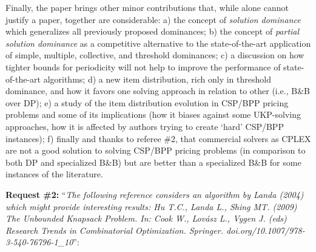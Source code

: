 \documentclass{elsarticle}
\begin{document}
Finally, the paper brings other minor contributions that, while alone cannot justify a paper, together are considerable:
a) the concept of \emph{solution dominance} which generalizes all previously proposed dominances; 
b) the concept of \emph{partial solution dominance} as a competitive alternative to the state-of-the-art application of simple, multiple, collective, and threshold dominances;
c) a discussion on how tighter bounds for periodicity will not help to improve the performance of state-of-the-art algorithms;
d) a new item distribution, rich only in threshold dominance, and how it favors one solving approach in relation to other (i.e., B\&B over DP);
e) a study of the item distribution evolution in CSP/BPP pricing problems and some of its implications (how it biases against some UKP-solving approaches, how it is affected by authors trying to create `hard' CSP/BPP instances);
f) finally and thanks to referee \#2, that commercial solvers as CPLEX are not a good solution to solving CSP/BPP pricing problems (in comparison to both DP and specialized B\&B) but are better than a specialized B\&B for some instances of the literature.
\bigskip

\textbf{Request \#2:} ``\textit{The following reference considers an algorithm by Landa (2004) which might provide interesting results: Hu T.C., Landa L., Shing MT. (2009) The Unbounded Knapsack Problem. In: Cook W., Lovász L., Vygen J. (eds) Research Trends in Combinatorial Optimization. Springer. doi.org/10.1007/978-3-540-76796-1\_10}'':
\end{document}
